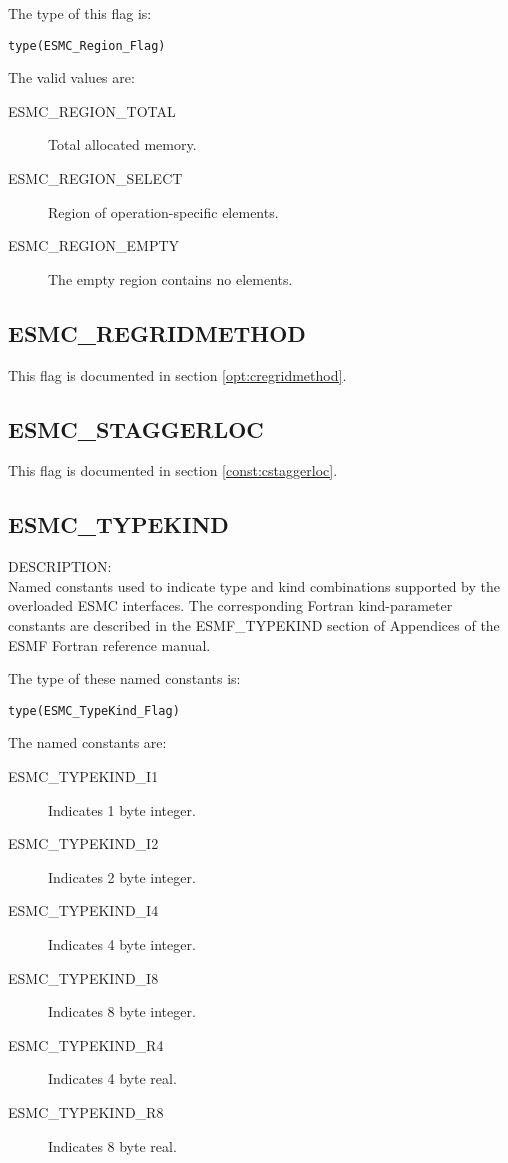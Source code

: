 The type of this flag is:

{\tt type(ESMC\_Region\_Flag)}

The valid values are:
\begin{description}
\item [ESMC\_REGION\_TOTAL]
      Total allocated memory.
\item [ESMC\_REGION\_SELECT]
      Region of operation-specific elements.
\item [ESMC\_REGION\_EMPTY]
      The empty region contains no elements.
\end{description}

\subsection{ESMC\_REGRIDMETHOD}
This flag is documented in section \ref{opt:cregridmethod}.

\subsection{ESMC\_STAGGERLOC}
This flag is documented in section \ref{const:cstaggerloc}.

\subsection{ESMC\_TYPEKIND}
\label{const:ctypekind}

{\sf DESCRIPTION:\\}
Named constants used to indicate type and kind combinations supported by the
overloaded ESMC interfaces. The corresponding Fortran kind-parameter constants 
are described in the ESMF\_TYPEKIND section of Appendices of the ESMF Fortran 
reference manual.

The type of these named constants is:

{\tt type(ESMC\_TypeKind\_Flag)}

The named constants are:
\begin{description}
\item [ESMC\_TYPEKIND\_I1]
      Indicates 1 byte integer.
\item [ESMC\_TYPEKIND\_I2]
      Indicates 2 byte integer.
\item [ESMC\_TYPEKIND\_I4]
      Indicates 4 byte integer.
\item [ESMC\_TYPEKIND\_I8]
      Indicates 8 byte integer.
\item [ESMC\_TYPEKIND\_R4]
      Indicates 4 byte real.
\item [ESMC\_TYPEKIND\_R8]
      Indicates 8 byte real.
\end{description}


